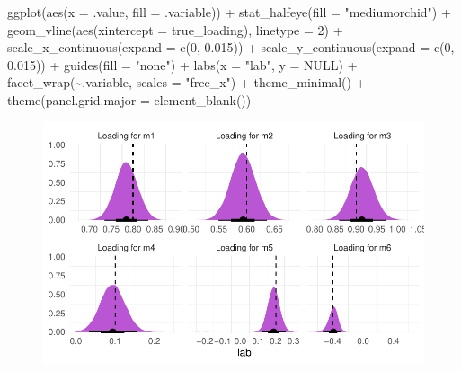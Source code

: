 \documentclass[
  letterpaper,
  DIV=11,
  numbers=noendperiod]{scrreprt}
\newenvironment{Shaded}{\begin{snugshade}}{\end{snugshade}}
\newcommand{\AttributeTok}[1]{\textcolor[rgb]{0.40,0.45,0.13}{#1}}
\newcommand{\ConstantTok}[1]{\textcolor[rgb]{0.56,0.35,0.01}{#1}}
\newcommand{\DecValTok}[1]{\textcolor[rgb]{0.68,0.00,0.00}{#1}}
\newcommand{\FloatTok}[1]{\textcolor[rgb]{0.68,0.00,0.00}{#1}}
\newcommand{\FunctionTok}[1]{\textcolor[rgb]{0.28,0.35,0.67}{#1}}
\newcommand{\NormalTok}[1]{\textcolor[rgb]{0.00,0.23,0.31}{#1}}
\newcommand{\SpecialCharTok}[1]{\textcolor[rgb]{0.37,0.37,0.37}{#1}}
\newcommand{\StringTok}[1]{\textcolor[rgb]{0.13,0.47,0.30}{#1}}
\begin{document}
\begin{Shaded}
\begin{Highlighting}[]
  \FunctionTok{ggplot}\NormalTok{(}\FunctionTok{aes}\NormalTok{(}\AttributeTok{x =}\NormalTok{ .value, }\AttributeTok{fill =}\NormalTok{ .variable)) }\SpecialCharTok{+}
  \FunctionTok{stat\_halfeye}\NormalTok{(}\AttributeTok{fill =} \StringTok{"mediumorchid"}\NormalTok{) }\SpecialCharTok{+}
  \FunctionTok{geom\_vline}\NormalTok{(}\FunctionTok{aes}\NormalTok{(}\AttributeTok{xintercept =}\NormalTok{ true\_loading), }\AttributeTok{linetype =} \DecValTok{2}\NormalTok{) }\SpecialCharTok{+} 
  \FunctionTok{scale\_x\_continuous}\NormalTok{(}\AttributeTok{expand =} \FunctionTok{c}\NormalTok{(}\DecValTok{0}\NormalTok{, }\FloatTok{0.015}\NormalTok{)) }\SpecialCharTok{+}
  \FunctionTok{scale\_y\_continuous}\NormalTok{(}\AttributeTok{expand =} \FunctionTok{c}\NormalTok{(}\DecValTok{0}\NormalTok{, }\FloatTok{0.015}\NormalTok{)) }\SpecialCharTok{+}
  \FunctionTok{guides}\NormalTok{(}\AttributeTok{fill =} \StringTok{"none"}\NormalTok{) }\SpecialCharTok{+}
  \FunctionTok{labs}\NormalTok{(}\AttributeTok{x =} \StringTok{"lab"}\NormalTok{,}
     \AttributeTok{y =} \ConstantTok{NULL}\NormalTok{)  }\SpecialCharTok{+}
  \FunctionTok{facet\_wrap}\NormalTok{(}\SpecialCharTok{\textasciitilde{}}\NormalTok{.variable, }\AttributeTok{scales =} \StringTok{"free\_x"}\NormalTok{) }\SpecialCharTok{+}
  \FunctionTok{theme\_minimal}\NormalTok{() }\SpecialCharTok{+} 
  \FunctionTok{theme}\NormalTok{(}\AttributeTok{panel.grid.major =} \FunctionTok{element\_blank}\NormalTok{())}
\end{Highlighting}
\end{Shaded}

\begin{figure}[H]

{\centering \includegraphics{./bayesian-cfa_files/figure-pdf/viz-draws-mtmm-loadings-1.pdf}

}

\end{figure}
\end{document}
